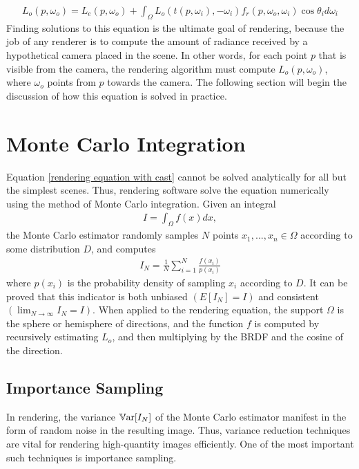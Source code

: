 \begin{align}
    L_o(p,\omega_o) = L_e(p,\omega_o) + \int_\Omega L_o(t(p,\omega_i),-\omega_i)f_r(p,\omega_o,\omega_i)\cos\theta_id\omega_i
    \label{rendering equation with cast}
\end{align}
Finding solutions to this equation is the ultimate goal of rendering, because the job of any renderer is to compute the amount of radiance received by a hypothetical camera placed in the scene. In other words, for each point $p$ that is visible from the camera, the rendering algorithm must compute $L_o(p,\omega_o)$, where $\omega_o$ points from $p$ towards the camera. The following section will begin the discussion of how this equation is solved in practice.

\section{Monte Carlo Integration}

Equation \ref{rendering equation with cast} cannot be solved analytically for all but the simplest scenes. Thus, rendering software solve the equation numerically using the method of Monte Carlo integration. Given an integral
\begin{align*}
    I = \int_\Omega f(x) dx,
\end{align*}
the Monte Carlo estimator randomly samples $N$ points $x_1,...,x_n\in \Omega$ according to some distribution $D$, and computes
\begin{align}
    I_N = \frac{1}{N}\sum_{i=1}^{N} \frac{f(x_i)}{p(x_i)}
    \label{monte carlo estimator}
\end{align}
where $p(x_i)$ is the probability density of sampling $x_i$ according to $D$. It can be proved that this indicator is both unbiased $(E[I_N]=I)$ and consistent $(\lim_{N\to\infty}I_N = I)$. When applied to the rendering equation, the support $\Omega$ is the sphere or hemisphere of directions, and the function $f$ is computed by recursively estimating $L_o$, and then multiplying by the BRDF and the cosine of the direction.

\subsection{Importance Sampling}

In rendering, the variance $\mathbb{V}\text{ar}[I_N]$ of the Monte Carlo estimator manifest in the form of random noise in the resulting image. Thus, variance reduction techniques are vital for rendering high-quantity images efficiently. One of the most important such techniques is importance sampling.

